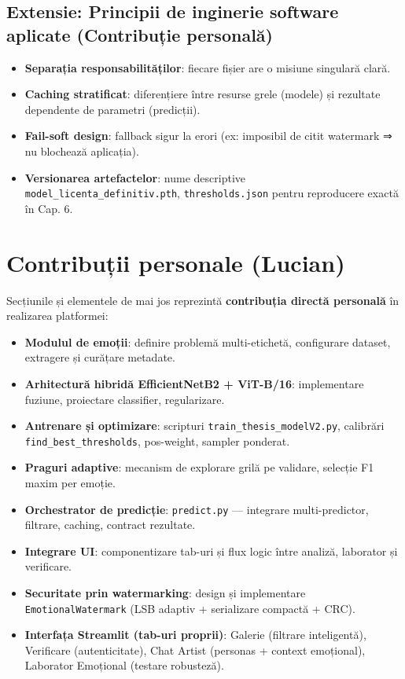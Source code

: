\subsection*{Extensie: Principii de inginerie software aplicate (Contribuție personală)}
\begin{itemize}
  \item \textbf{Separația responsabilităților}: fiecare fișier are o misiune singulară clară.
  \item \textbf{Caching stratificat}: diferențiere între resurse grele (modele) și rezultate dependente de parametri (predicții).
  \item \textbf{Fail-soft design}: fallback sigur la erori (ex: imposibil de citit watermark ⇒ nu blochează aplicația).
  \item \textbf{Versionarea artefactelor}: nume descriptive \texttt{model\_licenta\_definitiv.pth}, \texttt{thresholds.json} pentru reproducere exactă în Cap. 6.
\end{itemize}

\section{Contribuții personale (Lucian)}\label{sec:lucian-contributii}
Secțiunile și elementele de mai jos reprezintă \textbf{contribuția directă personală} în realizarea platformei:

\begin{itemize}
  \item \textbf{Modulul de emoții}: definire problemă multi-etichetă, configurare dataset, extragere și curățare metadate.
  \item \textbf{Arhitectură hibridă EfficientNetB2 + ViT-B/16}: implementare fuziune, proiectare classifier, regularizare.
  \item \textbf{Antrenare și optimizare}: scripturi \texttt{train\_thesis\_modelV2.py}, calibrări \texttt{find\_best\_thresholds}, pos-weight, sampler ponderat.
  \item \textbf{Praguri adaptive}: mecanism de explorare grilă pe validare, selecție F1 maxim per emoție.
  \item \textbf{Orchestrator de predicție}: \texttt{predict.py} — integrare multi-predictor, filtrare, caching, contract rezultate.
  \item \textbf{Integrare UI}: componentizare tab-uri și flux logic între analiză, laborator și verificare.
  \item \textbf{Securitate prin watermarking}: design și implementare \texttt{EmotionalWatermark} (LSB adaptiv + serializare compactă + CRC).
  \item \textbf{Interfața Streamlit (tab-uri proprii)}: Galerie (filtrare inteligentă), Verificare (autenticitate), Chat Artist (personas + context emoțional), Laborator Emoțional (testare robusteză).
\end{itemize}

